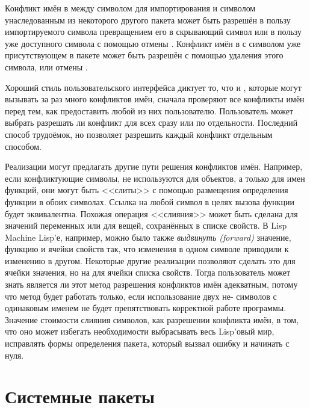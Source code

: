 Конфликт имён в  между символом для импортирования и
символом унаследованным из некоторого другого пакета может быть
разрешён в пользу импортируемого символа превращением его в скрывающий
символ или в пользу уже доступного символа с помощью отмены
. Конфликт имён в  с символом уже
присутствующем в пакете может быть разрешён с помощью
удаления этого символа, или отмены .

Хороший стиль пользовательского интерфейса диктует то, что  и
, которые могут вызывать за раз много конфликтов имён, сначала
проверяют все конфликты имён перед тем, как предоставить любой из них
пользователю.
Пользователь может выбрать разрешать ли конфликт для всех сразу или по
отдельности. Последний способ трудоёмок, но позволяет разрешить каждый конфликт
отдельным способом.

Реализации могут предлагать другие пути решения конфликтов имён.
Например, если конфликтующие символы, не используются для объектов, а только для
имен функций, они могут быть <<слиты>> с помощью размещения определения функции
в обоих символах. Ссылка на любой символ в целях вызова функции будет
эквивалентна. Похожая операция <<слияния>> может быть сделана для значений
переменных или для вещей, сохранённых в списке свойств. В Lisp Machine Lisp'е,
например, можно было также \emph{выдвинуть (forward)} значение, функцию и ячейки
свойств так, что изменения в одном символе приводили к изменению в
другом. Некоторые другие реализации позволяют сделать это для ячейки значения,
но на для ячейки списка свойств. Тогда пользователь может знать является ли этот
метод разрешения конфликтов имён адекватным, потому что метод будет работать
только, если использование двух не- символов с одинаковым именем не
будет препятствовать корректной работе программы. Значение стоимости слияния
символов, как разрешении конфликта имён, в том, что оно может избегать
необходимости выбрасывать весь Lisp'овый мир, исправлять формы определения
пакета, который вызвал ошибку и начинать с нуля.

\section{Системные пакеты}

